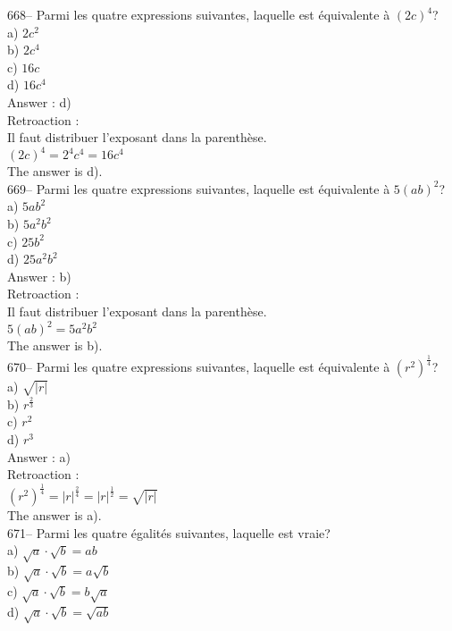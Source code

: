 ﻿\documentclass[letterpaper, 12pt]{article}
\begin{document}
668-- Parmi les quatre expressions suivantes, laquelle est \'equivalente \`a
$\left( 2c\right) ^{4}$?\\
a) $2c^{2}$\\
b) $2c^{4}$\\
c) $16c$\\
d) $16c^{4}$\\

Answer : d)\\

Retroaction : \\
Il faut distribuer l'exposant dans la parenth\`ese.\\
$\left( 2c\right) ^{4}=2^{4}c^{4}=16c^{4}$\\
The answer is d).\\

669-- Parmi les quatre expressions suivantes, laquelle est \'equivalente \`a
$5\left( ab\right) ^{2}$?\\
a) $5ab^{2}$\\
b) $5a^{2}b^{2}$\\
c) $25b^{2}$\\
d) $25a^{2}b^{2}$\\

Answer : b)\\

Retroaction : \\
Il faut distribuer l'exposant dans la parenth\`ese.\\
$5\left( ab\right) ^{2}=5a^{2}b^{2}$\\
The answer is b).\\

670-- Parmi les quatre expressions suivantes, laquelle est \'equivalente \`a
$\left( r^{2}\right)^\frac{1}{4}$?\\
a) $\sqrt{|r|}$\\
b) $r^{\frac{2}{3}}$\\
c) $r^{2}$\\
d) $r^{3}$\\

Answer : a)\\

Retroaction : \\
$\left( r^{2}\right)^\frac{1}{4}=|r|^\frac{2}{4}=|r|^\frac{1}{2}=\sqrt{|r|}$\\
The answer is a).\\

671-- Parmi les quatre \'egalit\'es suivantes, laquelle est vraie?\\
a) $\sqrt{a}\cdot\sqrt{b}=ab$\\
b) $\sqrt{a}\cdot\sqrt{b}=a\sqrt{b}$\\
c) $\sqrt{a}\cdot\sqrt{b}=b\sqrt{a}$\\
d) $\sqrt{a}\cdot\sqrt{b}=\sqrt{ab}$\\
\end{document}
